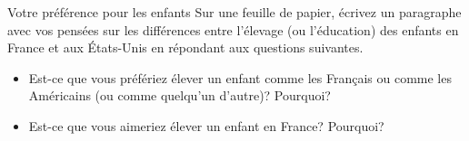 \begin{frame}{Votre préférence pour les enfants}
  Sur une feuille de papier, écrivez un paragraphe avec vos pensées sur les différences entre l'élevage (ou l'éducation) des enfants en France et aux États-Unis en répondant aux questions suivantes.
  \begin{itemize}
    \item Est-ce que vous préfériez élever un enfant comme les Français ou comme les Américains (ou comme quelqu'un d'autre)? Pourquoi?
    \item Est-ce que vous aimeriez élever un enfant en France? Pourquoi?
  \end{itemize}
\end{frame}